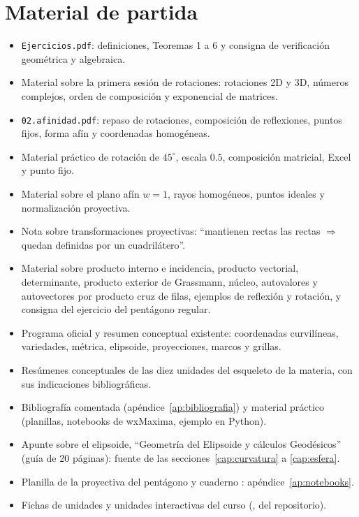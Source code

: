 \section*{Material de partida}\label{cap:22}

\begin{itemize}
  \item \texttt{Ejercicios.pdf}: definiciones, Teoremas 1 a 6 y consigna de
  verificación geométrica y algebraica.
  \item Material sobre la primera sesión de rotaciones: rotaciones 2D y 3D, números
  complejos, orden de composición y exponencial de matrices.
  \item \texttt{02.afinidad.pdf}: repaso de rotaciones, composición de
  reflexiones, puntos fijos, forma afín y coordenadas homogéneas.
  \item Material práctico de rotación de \(45^\circ\),
  escala \(0.5\), composición matricial, Excel y punto fijo.
  \item Material sobre el plano afín \(w=1\),
  rayos homogéneos, puntos ideales y normalización proyectiva.
  \item Nota sobre transformaciones proyectivas: ``mantienen rectas las rectas
  \(\Rightarrow\) quedan definidas por un cuadrilátero''.
  \item Material sobre producto interno e
  incidencia, producto vectorial, determinante, producto exterior de Grassmann, núcleo,
  autovalores y autovectores por producto cruz de filas, ejemplos de reflexión y rotación,
  y consigna del ejercicio del pentágono regular.
  \item Programa oficial y resumen conceptual existente: coordenadas curvilíneas,
  variedades, métrica, elipsoide, proyecciones, marcos y grillas.
  \item Resúmenes conceptuales de las diez unidades del esqueleto de la materia, con sus
  indicaciones bibliográficas.
  \item Bibliografía comentada (apéndice~\ref{ap:bibliografia}) y material práctico
  (planillas, notebooks de wxMaxima, ejemplo en Python).
  \item Apunte sobre el elipsoide, ``Geometría del Elipsoide y cálculos Geodésicos'' (guía
  de 20 páginas): fuente de las
  secciones~\ref{cap:curvatura} a \ref{cap:esfera}.
  \item Planilla de la proyectiva del pentágono y cuaderno :
  apéndice~\ref{ap:notebooks}.
  \item Fichas de unidades y unidades interactivas del curso (,  del
  repositorio).
\end{itemize}

